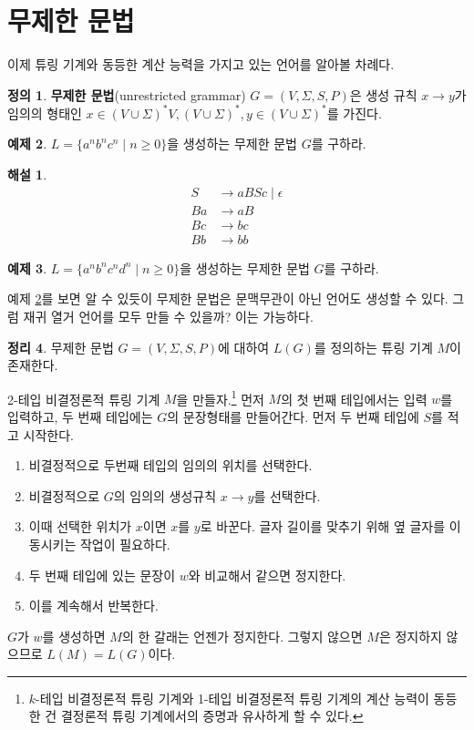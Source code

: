 \documentclass[b5paper, 11pt]{book}
\theoremstyle{definition}
\newtheorem{defn}{정의}[chapter]
\newtheorem{thm}[defn]{정리}
\newtheorem{ex}[defn]{예제}
\newtheorem*{ans*}{해설}
\newenvironment{pf*}{\pushQED{\qed}\pf}
{\popQED\endpf}
\begin{document}
\section{무제한 문법}
이제 튜링 기계와 동등한 계산 능력을 가지고 있는 언어를 알아볼 차례다. 
\begin{defn}
    \textbf{무제한 문법}(unrestricted grammar) $G = (V, \Sigma , S, P)$은 생성 규칙 $x \rightarrow y$가 임의의 형태인 $x \in (V \cup \Sigma)^* V, (V \cup \Sigma)^*, y \in (V \cup \Sigma)^*$를 가진다.
\end{defn}
\begin{ex} \label{UG_ex}
    $L = \{a^n b^n c^n \;\vert\; n \ge 0\}$을 생성하는 무제한 문법 $G$를 구하라.
\end{ex}
\begin{ans*}
    \begin{align*}
        S &\rightarrow aBSc \;\vert\; \epsilon \\ 
        Ba &\rightarrow aB \\ 
        Bc &\rightarrow bc \\ 
        Bb &\rightarrow bb 
    \end{align*}
\end{ans*}
\begin{ex}
    $L = \{a^n b^n c^n d^n \;\vert\; n \ge 0\}$을 생성하는 무제한 문법 $G$를 구하라.
\end{ex}
예제 \ref{UG_ex}를 보면 알 수 있듯이 무제한 문법은 문맥무관이 아닌 언어도 생성할 수 있다. 그럼 재귀 열거 언어를 모두 만들 수 있을까? 이는 가능하다.
\begin{thm}
    무제한 문법 $G = (V, \Sigma, S, P)$에 대하여 $L(G)$를 정의하는 튜링 기계 $M$이 존재한다.
\end{thm}
\begin{pf*}
    2-테입 비결정론적 튜링 기계 $M$을 만들자.\footnote{$k$-테입 비결정론적 튜링 기계와 1-테입 비결정론적 튜링 기계의 계산 능력이 동등한 건 결정론적 튜링 기계에서의 증명과 유사하게 할 수 있다.} 먼저 $M$의 첫 번째 테입에서는 입력 $w$를 입력하고, 두 번째 테입에는 $G$의 문장형태를 만들어간다. 먼저 두 번째 테입에 $S$를 적고 시작한다.
    \begin{enumerate}
        \item 비결정적으로 두번째 테입의 임의의 위치를 선택한다.
        \item 비결정적으로 $G$의 임의의 생성규칙 $x \rightarrow y$를 선택한다.
        \item 이때 선택한 위치가 $x$이면 $x$를 $y$로 바꾼다. 글자 길이를 맞추기 위해 옆 글자를 이동시키는 작업이 필요하다.
        \item 두 번째 테입에 있는 문장이 $w$와 비교해서 같으면 정지한다.
        \item 이를 계속해서 반복한다.
    \end{enumerate}
    $G$가 $w$를 생성하면 $M$의 한 갈래는 언젠가 정지한다. 그렇지 않으면 $M$은 정지하지 않으므로 $L(M) = L(G)$이다.
\end{pf*}
\end{document}
